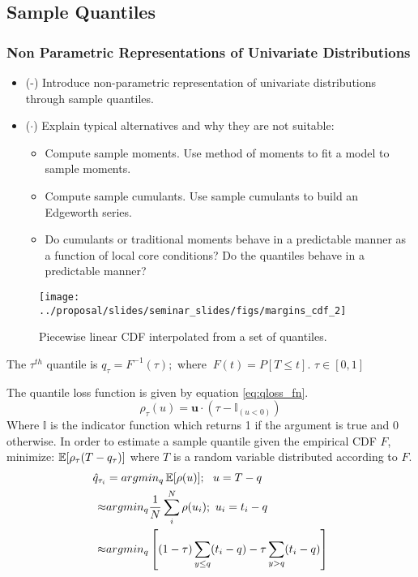 \subsection{Sample Quantiles}

\subsubsection{Non Parametric Representations of Univariate Distributions}

\begin{itemize}
    \item (\checkmark-) Introduce non-parametric representation of univariate distributions through sample quantiles.
    \item ($\cdot$) Explain typical alternatives and why they are not suitable:
        \begin{itemize}
            \item Compute sample moments.  Use method of moments to fit a model to sample moments.
            \item Compute sample cumulants.  Use sample cumulants to build an Edgeworth series.
            \item Do cumulants or traditional moments behave in a predictable manner as a function of local core conditions?  Do the quantiles behave in a predictable manner?
        \end{itemize}
\end{itemize}

\begin{figure}[H]
    \centering
    \texttt{[image: ../proposal/slides/seminar\_slides/figs/margins\_cdf\_2]}
    \caption[CDF from quantiles.]{Piecewise linear CDF interpolated from a set of quantiles.}
    \label{fig:marginscdf2}
\end{figure}


The $\tau^{th}$ quantile is $q_\tau = F^{-1}(\tau); $ where $\ F(t)=P[T \leq t]$.
$\tau \in [0, 1]$

The quantile loss function is given by equation \ref{eq:qloss_fn}.
\begin{equation}
\rho_\tau( u) = \mathbf u \cdot (\tau - \mathbb{I}_{( u < 0)})
\label{eq:qloss_fn}
\end{equation}
Where $\mathbb{I}$ is the indicator function which returns 1 if the argument is true and 0 otherwise.
In order to estimate a sample quantile given the empirical CDF $F$, minimize: $\operatorname*{\mathbb{E}}[\rho_\tau(T - q_\tau)]$ where $T$ is a random variable distributed according to $F$.
\begin{equation}
            \left.\begin{aligned}
            \hat q_{\tau_i} &= argmin_{q} \E[\rho(u)];\ \  u = T - q  \\
            \approx & argmin_q  \frac{1}{N} \sum_i^N \rho(u_i); \ u_i = t_i - q \\
            \approx & argmin_q \left[ (1-\tau) \sum_{y \leq q}( t_i - q ) - \tau \sum_{y > q} (t_i - q) \right]
            \end{aligned}\right.
\end{equation}



